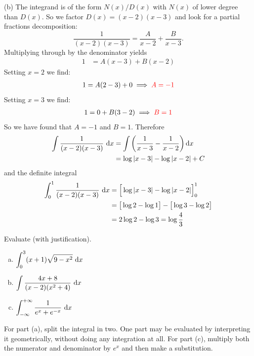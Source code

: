 \begin{solution}
\begin{description}
\end{description}


\noindent (b)
The integrand is of the form $N(x)/D(x)$ with $N(x)$ of lower degree
than $D(x)$. So we factor $D(x)=(x-2)(x-3)$ and look for a partial fractions decomposition:
\begin{equation*}
\frac{1}{(x-2)(x-3)} = \frac{A}{x-2} + \frac{B}{x-3}.
\end{equation*}
Multiplying through by the denominator yields
\begin{align*}
1 &= A(x-3) + B(x-2)
\end{align*}
Setting $x=2$ we find:
\begin{align*}
   1 = A(2-3) + 0 \implies\color{red}  A = -1
\end{align*}
Setting $x=3$ we find:
\begin{align*}
   1 = 0 + B(3-2) \implies \color{red} B = 1
\end{align*}
So we have found that $A=-1$ and $B=1$. Therefore
\begin{align*}
  \int\frac{1}{(x-2)(x-3)}\ \mathrm{d}x
  &= \int \bigg( \frac{1}{x-3} - \frac{1}{x-2} \bigg) \,\mathrm{d}x \\
   &=  \log |x-3| -  \log|x-2| + C
\end{align*}
and the definite integral
\begin{align*}
  \int_0^1\frac{1}{(x-2)(x-3)}\ \mathrm{d}x
   &=  \Big[\log |x-3| -  \log|x-2|\Big]_0^1 \\
   &=  \big[\log 2 -  \log 1\big]-\big[\log 3 - \log 2\big]  \\
   &= 2\log 2 -\log 3 = \log\frac{4}{3}
\end{align*}


\end{solution}




\begin{question}[M121 2012A]
Evaluate (with justification).

\begin{enumerate}[(a)]
\item
$\displaystyle\int_0^3(x+1)\sqrt{9-x^2} \ \mathrm{d}x$
\item
$\displaystyle\int\frac{4x+8}{(x-2)(x^2+4)}\ \dee{x}$
\item
$\displaystyle\int_{-\infty}^{+\infty} \frac{1}{e^x+e^{-x}}\ \mathrm{d}x$
\end{enumerate}
\end{question}

\begin{hint}
For part (a), split the integral in two. One part may be evaluated
 by interpreting it geometrically, without doing any integration at all.
For part (c), multiply both the numerator and denominator by $e^x$
and then make a substitution.

\end{hint}

